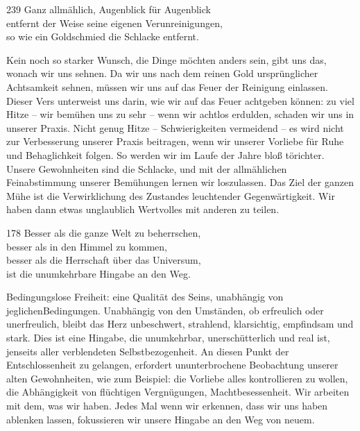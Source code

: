 
\begin{dhpVerse}{239}
\label{dhp-239}
Ganz allmählich, Augenblick für Augenblick\\ 
entfernt der Weise seine eigenen Verunreinigungen,\\ 
so wie ein Goldschmied die Schlacke entfernt. 
\end{dhpVerse}

\begin{dhpRefl}

Kein noch so starker Wunsch, die Dinge möchten anders sein, gibt uns das,
wonach wir uns sehnen. Da wir uns nach dem reinen Gold ursprünglicher
Achtsamkeit sehnen, müssen wir uns auf das Feuer der Reinigung einlassen.
Dieser Vers unterweist uns darin, wie wir auf das Feuer achtgeben können: zu
viel Hitze -- wir bemühen uns zu sehr -- wenn wir achtlos erdulden, schaden
wir uns in unserer Praxis. Nicht genug Hitze -- Schwierigkeiten vermeidend --
es wird nicht zur Verbesserung unserer Praxis beitragen, wenn wir unserer
Vorliebe für Ruhe und Behaglichkeit folgen. So werden wir im Laufe der Jahre
bloß törichter. Unsere Gewohnheiten sind die Schlacke, und mit der
allmählichen Feinabstimmung unserer Bemühungen lernen wir loszulassen. Das
Ziel der ganzen Mühe ist die Verwirklichung des Zustandes leuchtender
Gegenwärtigkeit. Wir haben dann etwas unglaublich Wertvolles mit anderen zu
teilen.

\end{dhpRefl}


\begin{dhpVerse}{178}
\label{dhp-178}
Besser als die ganze Welt zu beherrschen,\\ 
besser als in den Himmel zu kommen,\\ 
besser als die Herrschaft über das Universum,\\ 
ist die unumkehrbare Hingabe an den Weg. 
\end{dhpVerse}

\begin{dhpRefl}

Bedingungslose Freiheit: eine Qualität des Seins, unabhängig von
jeglichenBedingungen. Unabhängig von den Umständen, ob erfreulich oder
unerfreulich, bleibt das Herz unbeschwert, strahlend, klarsichtig, empfindsam
und stark. Dies ist eine Hingabe, die unumkehrbar, unerschütterlich und real
ist, jenseits aller verblendeten Selbstbezogenheit. An diesen Punkt der
Entschlossenheit zu gelangen, erfordert ununterbrochene Beobachtung unserer
alten Gewohnheiten, wie zum Beispiel: die Vorliebe alles kontrollieren zu
wollen, die Abhängigkeit von flüchtigen Vergnügungen, Machtbesessenheit. Wir
arbeiten mit dem, was wir haben. Jedes Mal wenn wir erkennen, dass wir uns
haben ablenken lassen, fokussieren wir unsere Hingabe an den Weg von neuem.

\end{dhpRefl}

